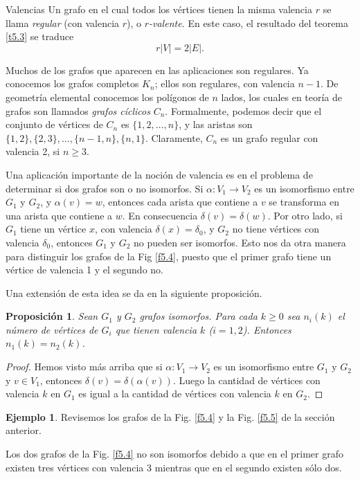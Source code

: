 \documentclass[11pt,spanish,makeidx]{amsbook}
\newtheorem{proposicion}[teorema]{Proposici\'on}
\theoremstyle{definition}
\newtheorem{ejemplo}{Ejemplo}[section]
\theoremstyle{remark}
\begin{document}
\begin{section}{Valencias}
Un grafo en el cual todos los vértices tienen la misma valencia $r$ se llama {\em regular}   (con valencia $r$), o {\em $r$-valente.} En este caso, el resultado del teorema \ref{t5.3} se traduce
$$
r|V|=2|E|.
$$

Muchos de los grafos que aparecen en las aplicaciones son regulares. Ya conocemos los  grafos completos $K_n$; ellos son regulares, con valencia $n-1$. De geometría elemental conocemos los polígonos de $n$ lados, los cuales en teoría de grafos son llamados {\em {grafos cíclicos}}   $C_n$. Formalmente, podemos decir que el conjunto de vértices de $C_n$ es $\{1,2,\ldots,n\}$, y las aristas son $\{1,2\},\{2,3\},\ldots,\{n-1,n\},\{n,1\} $. Claramente, $C_n$ es un grafo regular con valencia 2, si $n\ge 3$.

Una aplicación importante de la noción de valencia es en el problema de determinar si dos grafos son o no isomorfos. Si $\alpha:V_1 \to  V_2$ es un isomorfismo entre $G_1$ y $G_2$, y $\alpha(v)=w$, entonces cada arista que contiene a $v$ se transforma en una arista que contiene a $w$. En consecuencia $\delta(v)=\delta(w)$. Por otro lado, si $G_1$ tiene un vértice $x$, con valencia $\delta(x)=\delta_0$, y $G_2$ no tiene vértices con valencia $\delta_0$, entonces $G_1$ y $G_2$ no pueden ser isomorfos. Esto nos da otra manera para distinguir los grafos de la Fig \ref{f5.4}, puesto que el primer grafo tiene un vértice de valencia 1 y el segundo no.

Una extensión de esta idea se da en la siguiente proposición.

\begin{proposicion}\label{criterioiso}Sean  $G_1$ y $G_2$ grafos isomorfos. Para cada $k\ge 0$ sea $n_i(k)$ el número de vértices de $G_i$ que tienen valencia $k$ ($i=1,2$). Entonces $n_1(k)=n_2(k)$.
\end{proposicion}
\begin{proof} Hemos visto más arriba que si $\alpha:V_1 \to  V_2$ es un isomorfismo entre $G_1$ y $G_2$ y $v\in V_1$, entonces $\delta(v)=\delta(\alpha(v))$. Luego la cantidad de vértices con valencia $k$ en $G_1$ es igual  a la cantidad de vértices con valencia $k$ en $G_2$.     
\end{proof}

\begin{ejemplo} Revisemos los grafos de la Fig. \ref{f5.4} y la Fig. \ref{f5.5} de la sección anterior. 

Los dos grafos de la Fig. \ref{f5.4}  no son isomorfos debido a que en el primer grafo existen tres vértices con valencia 3 mientras que en el segundo existen sólo dos.


\end{ejemplo}
\end{section}
\end{document}
